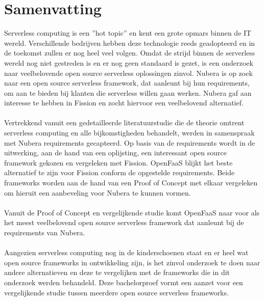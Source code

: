 \chapter*{Samenvatting}
Serverless computing is een ''hot topic'' en kent een grote opmars binnen de IT wereld. Verschillende bedrijven hebben deze technologie reeds geadopteerd en in de toekomst zullen er nog heel veel volgen. Omdat de strijd binnen de serverless wereld nog niet gestreden is en er nog geen standaard is gezet, is een onderzoek naar veelbelovende open source serverless oplossingen zinvol. Nubera is op zoek naar een open source serverless framework, dat aanleunt bij hun requirements, om aan te bieden bij klanten die serverless willen gaan werken. Nubera gaf aan interesse te hebben in Fission en zocht hiervoor een veelbelovend alternatief. 
\\\\
Vertrekkend vanuit een gedetailleerde literatuurstudie die de theorie omtrent serverless computing en alle bijkomstigheden behandelt, werden in samenspraak met Nubera requirements gecapteerd. Op basis van de requirements wordt in de uitwerking, aan de hand van een oplijsting, een interessant open source framework gekozen en vergeleken met Fission. OpenFaaS blijkt het beste alternatief te zijn voor Fission conform de opgestelde requirements. Beide frameworks worden aan de hand van een Proof of Concept met elkaar vergeleken om hieruit een aanbeveling voor Nubera te kunnen vormen. 
\\\\
Vanuit de Proof of Concept en vergelijkende studie komt OpenFaaS naar voor als het meest veelbelovend open source serverless framework dat aanleunt bij de requirements van Nubera.
\\\\
Aangezien serverless computing nog in de kinderschoenen staat en er heel wat open source frameworks in ontwikkeling zijn, is het zinvol onderzoek te doen naar andere alternatieven en deze te vergelijken met de frameworks die in dit onderzoek werden behandeld. Deze bachelorproef vormt een aanzet voor een vergelijkende studie tussen meerdere open source serverless frameworks.
